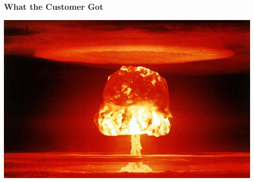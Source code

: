 \documentclass[xcolor=dvipsnames]{beamer}
\begin{document}
\begin{frame}
  \frametitle{What the Customer Got}
  \includegraphics[width=\textwidth]{images/nuclear}
\end{frame}
\end{document}
